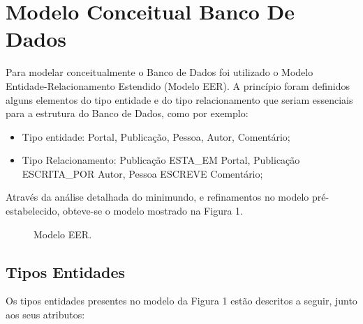 \section{Modelo Conceitual Banco De Dados}

Para modelar conceitualmente o Banco de Dados foi utilizado o Modelo Entidade-Relacionamento Estendido (Modelo EER). A princípio foram definidos alguns elementos do tipo entidade e do tipo relacionamento que seriam essenciais para a estrutura do Banco de Dados, como por exemplo:

\begin{itemize}
				\item Tipo entidade: Portal, Publicação, Pessoa, Autor, Comentário; 

				\item  Tipo Relacionamento: Publicação ESTA\_EM Portal, Publicação ESCRITA\_POR Autor, Pessoa ESCREVE Comentário;
\end{itemize}

Através da análise detalhada do minimundo, e refinamentos no modelo pré-estabelecido, obteve-se o modelo mostrado na Figura 1.

\begin{figure}[H]
				\centering

\caption{Modelo EER.}
\end{figure}
\subsection{Tipos Entidades}

Os tipos entidades presentes no modelo da Figura 1 estão descritos a seguir, junto aos seus atributos:

